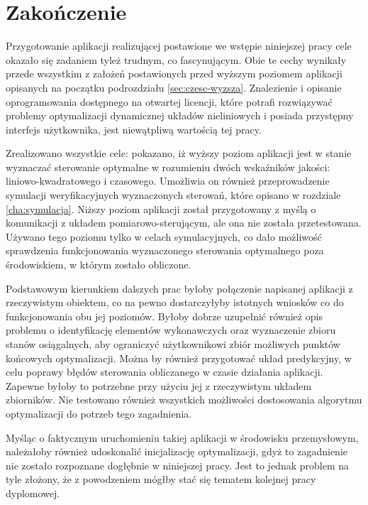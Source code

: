 \chapter*{Zakończenie}
\label{cha:zakonczenie}

Przygotowanie aplikacji realizującej postawione we wstępie niniejszej pracy cele okazało się zadaniem tyleż trudnym, co fascynującym. Obie te cechy wynikały przede wszystkim z założeń postawionych przed wyższym poziomem aplikacji opisanych na początku podrozdziału \ref{sec:czesc-wyzsza}. Znalezienie i opisanie oprogramowania dostępnego na otwartej licencji, które potrafi rozwiązywać problemy optymalizacji dynamicznej układów nieliniowych i posiada przystępny interfejs użytkownika, jest niewątpliwą wartością tej pracy.

Zrealizowano wszystkie cele: pokazano, iż wyższy poziom aplikacji jest w stanie wyznaczać sterowanie optymalne w rozumieniu dwóch wskaźników jakości: liniowo-kwadratowego i czasowego. Umożliwia on również przeprowadzenie symulacji weryfikacyjnych wyznaczonych sterowań, które opisano w rozdziale \ref{cha:symulacja}. Niższy poziom aplikacji został przygotowany z myślą o komunikacji z układem pomiarowo-sterującym, ale ona nie została przetestowana. Używano tego poziomu tylko w celach symulacyjnych, co dało możliwość sprawdzenia funkcjonowania wyznaczonego sterowania optymalnego poza środowiskiem, w którym zostało obliczone.

Podstawowym kierunkiem dalszych prac byłoby połączenie napisanej aplikacji z rzeczywistym obiektem, co na pewno dostarczyłyby istotnych wniosków co do funkcjonowania obu jej poziomów. Byłoby dobrze uzupełnić również opis problemu o identyfikację elementów wykonawczych oraz wyznaczenie zbioru stanów osiągalnych, aby ograniczyć użytkownikowi zbiór możliwych punktów końcowych optymalizacji. Można by również przygotować układ predykcyjny, w celu poprawy błędów sterowania obliczanego w czasie działania aplikacji. Zapewne byłoby to potrzebne przy użyciu jej z rzeczywistym układem zbiorników. Nie testowano również wszystkich możliwości dostosowania algorytmu optymalizacji do potrzeb tego zagadnienia.

Myśląc o faktycznym uruchomieniu takiej aplikacji w środowisku przemysłowym, należałoby również udoskonalić inicjalizację optymalizacji, gdyż to zagadnienie nie zostało rozpoznane dogłębnie w niniejszej pracy. Jest to jednak problem na tyle złożony, że z powodzeniem mógłby stać się tematem kolejnej pracy dyplomowej.
